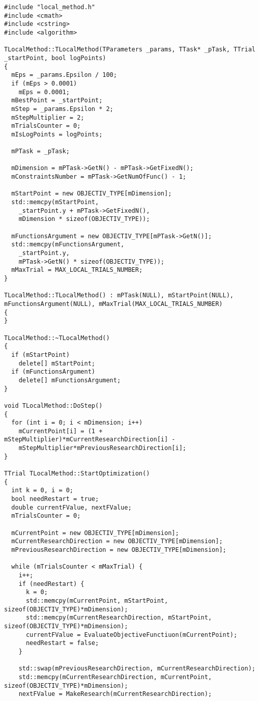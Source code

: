 \begin{lstlisting}[frame=single]
#include "local_method.h"
#include <cmath>
#include <cstring>
#include <algorithm>

TLocalMethod::TLocalMethod(TParameters _params, TTask* _pTask, TTrial _startPoint, bool logPoints)
{
  mEps = _params.Epsilon / 100;
  if (mEps > 0.0001)
    mEps = 0.0001;
  mBestPoint = _startPoint;
  mStep = _params.Epsilon * 2;
  mStepMultiplier = 2;
  mTrialsCounter = 0;
  mIsLogPoints = logPoints;

  mPTask = _pTask;

  mDimension = mPTask->GetN() - mPTask->GetFixedN();
  mConstraintsNumber = mPTask->GetNumOfFunc() - 1;

  mStartPoint = new OBJECTIV_TYPE[mDimension];
  std::memcpy(mStartPoint,
    _startPoint.y + mPTask->GetFixedN(),
    mDimension * sizeof(OBJECTIV_TYPE));

  mFunctionsArgument = new OBJECTIV_TYPE[mPTask->GetN()];
  std::memcpy(mFunctionsArgument,
    _startPoint.y,
    mPTask->GetN() * sizeof(OBJECTIV_TYPE));
  mMaxTrial = MAX_LOCAL_TRIALS_NUMBER;
}

TLocalMethod::TLocalMethod() : mPTask(NULL), mStartPoint(NULL),
mFunctionsArgument(NULL), mMaxTrial(MAX_LOCAL_TRIALS_NUMBER)
{
}

TLocalMethod::~TLocalMethod()
{
  if (mStartPoint)
    delete[] mStartPoint;
  if (mFunctionsArgument)
    delete[] mFunctionsArgument;
}

void TLocalMethod::DoStep()
{
  for (int i = 0; i < mDimension; i++)
    mCurrentPoint[i] = (1 + mStepMultiplier)*mCurrentResearchDirection[i] -
    mStepMultiplier*mPreviousResearchDirection[i];
}

TTrial TLocalMethod::StartOptimization()
{
  int k = 0, i = 0;
  bool needRestart = true;
  double currentFValue, nextFValue;
  mTrialsCounter = 0;

  mCurrentPoint = new OBJECTIV_TYPE[mDimension];
  mCurrentResearchDirection = new OBJECTIV_TYPE[mDimension];
  mPreviousResearchDirection = new OBJECTIV_TYPE[mDimension];

  while (mTrialsCounter < mMaxTrial) {
    i++;
    if (needRestart) {
      k = 0;
      std::memcpy(mCurrentPoint, mStartPoint, sizeof(OBJECTIV_TYPE)*mDimension);
      std::memcpy(mCurrentResearchDirection, mStartPoint, sizeof(OBJECTIV_TYPE)*mDimension);
      currentFValue = EvaluateObjectiveFunctiuon(mCurrentPoint);
      needRestart = false;
    }

    std::swap(mPreviousResearchDirection, mCurrentResearchDirection);
    std::memcpy(mCurrentResearchDirection, mCurrentPoint, sizeof(OBJECTIV_TYPE)*mDimension);
    nextFValue = MakeResearch(mCurrentResearchDirection);


\end{lstlisting}
